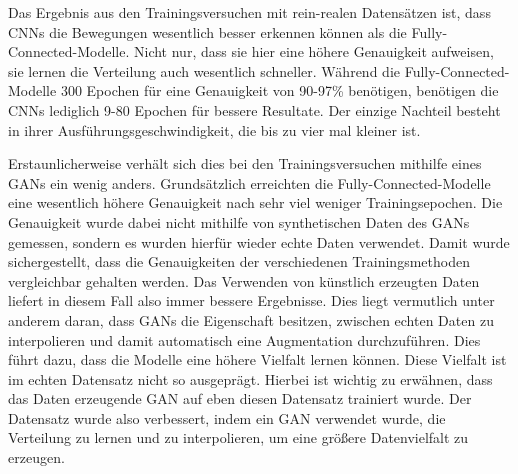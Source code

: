 Das Ergebnis aus den Trainingsversuchen mit rein-realen Datensätzen ist, dass
CNNs die Bewegungen wesentlich besser erkennen können als die
Fully-Connected-Modelle. Nicht nur, dass sie hier eine höhere Genauigkeit
aufweisen, sie lernen die Verteilung auch wesentlich schneller. Während die
Fully-Connected-Modelle 300 Epochen für eine Genauigkeit von 90-97\% benötigen,
benötigen die CNNs lediglich 9-80 Epochen für bessere Resultate. Der einzige
Nachteil besteht in ihrer Ausführungsgeschwindigkeit, die bis zu vier mal
kleiner ist.

Erstaunlicherweise verhält sich dies bei den Trainingsversuchen mithilfe eines
GANs ein wenig anders. Grundsätzlich erreichten die Fully-Connected-Modelle eine
wesentlich höhere Genauigkeit nach sehr viel weniger Trainingsepochen. Die
Genauigkeit wurde dabei nicht mithilfe von synthetischen Daten des GANs
gemessen, sondern es wurden hierfür wieder echte Daten verwendet. Damit wurde
sichergestellt, dass die Genauigkeiten der verschiedenen Trainingsmethoden
vergleichbar gehalten werden. Das Verwenden von künstlich erzeugten Daten
liefert in diesem Fall also immer bessere Ergebnisse. Dies liegt vermutlich
unter anderem daran, dass GANs die Eigenschaft besitzen, zwischen echten Daten
zu interpolieren und damit automatisch eine Augmentation durchzuführen. Dies
führt dazu, dass die Modelle eine höhere Vielfalt lernen können. Diese Vielfalt
ist im echten Datensatz nicht so ausgeprägt. Hierbei ist wichtig zu erwähnen,
dass das Daten erzeugende GAN auf eben diesen Datensatz trainiert wurde. Der
Datensatz wurde also verbessert, indem ein GAN verwendet wurde, die Verteilung
zu lernen und zu interpolieren, um eine größere Datenvielfalt zu erzeugen.

